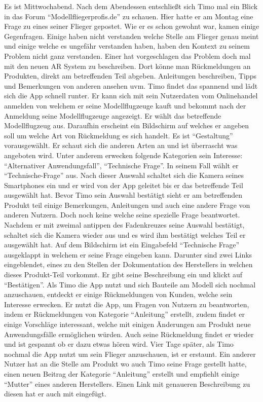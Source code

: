 Es ist Mittwochabend. Nach dem Abendessen entschließt sich Timo mal ein Blick in das Forum
“Modellfliegerprofis.de” zu schauen. Hier hatte er am Montag eine Frage zu eines seiner Flieger
gepostet. Wie er es schon gewohnt war, kamen einige Gegenfragen. Einige haben nicht verstanden
welche Stelle am Flieger genau meint und einige welche es ungefähr verstanden haben, haben den
Kontext zu seinem Problem nicht ganz verstanden. Einer hat vorgeschlagen das Problem doch mal
mit den neuen AR System zu beschreiben. Dort könne man Rückmeldungen an Produkten, direkt am
betreffenden Teil abgeben. Anleitungen beschreiben, Tipps und Bemerkungen von anderen ansehen
uvm. Timo findet das spannend und lädt sich die App schnell runter. Er kann sich mit sein
Nutzerdaten vom Onlinehandel anmelden von welchem er seine Modellflugzeuge kauft und bekommt
nach der Anmeldung seine Modellflugzeuge angezeigt. Er wählt das betreffende Modellflugzeug aus.
Daraufhin erscheint ein Bildschirm auf welches er angeben soll um welche Art von Rückmeldung es
sich handelt. Es ist “Gestaltung” vorausgewählt. Er schaut sich die anderen Arten an und ist
überrascht was angeboten wird. Unter anderem erwecken folgende Kategorien sein Interesse:
“Alternativer Anwendungsfall”, “Technische Frage”. In seinem Fall wählt er “Technische-Frage” aus.
Nach dieser Auswahl schaltet sich die Kamera seines Smartphones ein und er wird von der App
geleitet bis er das betreffende Teil ausgewählt hat. Bevor Timo sein Auswahl bestätigt sieht er am
betreffenden Produkt teil einige Bemerkungen, Anleitungen und auch eine andere Frage von anderen
Nutzern. Doch noch keine welche seine spezielle Frage beantwortet. Nachdem er mit zweimal
antippen des Fadenkreuzes seine Auswahl bestätigt, schaltet sich die Kamera wieder aus und es wird
ihm bestätigt welches Teil er ausgewählt hat. Auf dem Bildschirm ist ein Eingabefeld “Technische
Frage” ausgeklappt in welchem er seine Frage eingeben kann. Darunter sind zwei Links
eingeblendet, eines zu den Stellen der Dokumentation des Herstellers in welchen dieses Produkt-Teil
vorkommt.
Er gibt seine Beschreibung ein und klickt auf “Bestätigen”. Als Timo die App nutzt und sich Bauteile
am Modell sich nochmal anzuschauen, entdeckt er einige Rückmeldungen von Kunden, welche sein
Interesse erwecken. Er nutzt die App, um Fragen von Nutzern zu beantworten, indem er
Rückmeldungen von Kategorie “Anleitung” erstellt, zudem findet er einige Vorschläge interessant,
welche mit einigen Änderungen am Produkt neue Anwendungsfälle ermöglichen würden. Auch seine
Rückmeldung findet er wieder und ist gespannt ob er dazu etwas hören wird.
Vier Tage später, als Timo nochmal die App nutzt um sein Flieger anzuschauen, ist er erstaunt. Ein
anderer Nutzer hat an die Stelle am Produkt wo auch Timo seine Frage gestellt hatte, einen neuen
Beitrag der Kategorie “Anleitung” erstellt und empfiehlt einige “Mutter” eines anderen Herstellers.
Einen Link mit genaueren Beschreibung zu diesen hat er auch mit eingefügt.



